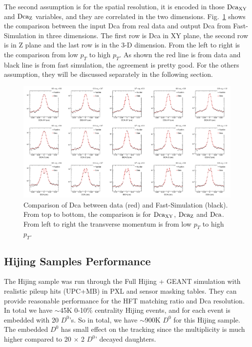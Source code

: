 \documentclass[a4paper]{article}
\begin{document}
The second assumption is for the spatial resolution, it is encoded in those $\textup{Dca}_{\textup{XY}}$ and $\textup{Dca}_{\textup{Z}}$ variables, and they are correlated in the two dimensions. Fig.~\ref{assumption2} shows the comparison between the input Dca from real data and output Dca from Fast-Simulation in three dimensions. The first row is Dca in XY plane, the second row is in Z plane and the last row is in the 3-D dimension. From the left to right is the comparison from low $p_{T}$ to high $p_{T}$. As shown the red line is from data and black line is from fast simulation, the agreement is pretty good.
For the others assumption, they will be discussed separately in the following section.

\begin{figure}[htbp]
\centering
\includegraphics[keepaspectratio,width=1.0\textwidth]{fig/assumption2.png}
\caption{Comparison of Dca between data (red) and Fast-Simulation (black). From top to bottom, the comparison is for $\textup{Dca}_{\textup{XY}}$, $\textup{Dca}_{\textup{Z}}$ and $\textup{Dca}$. From left to right the transverse momentum is from low $p_T$ to high $p_T$.}
\label{assumption2}
\end{figure}

\subsection{Hijing Samples Performance}
\label{hijingsample}
The Hijing sample was run through the Full Hijing + GEANT simulation with realistic pileup hits (UPC+MB) in PXL and sensor masking tables. They can provide reasonable performance for the HFT matching ratio and Dca resolution. 
In total we have $\sim$45K 0-10\% centrality Hijing events, and for each event is embedded with 20 $D^0$'s. So in total, we have $\sim$900K $D^0$ for this Hijing sample. The embedded $D^0$ has small effect on the tracking since the multiplicity is much higher compared to 20 $\times$ 2 $D^0$' decayed daughters.
\end{document}

